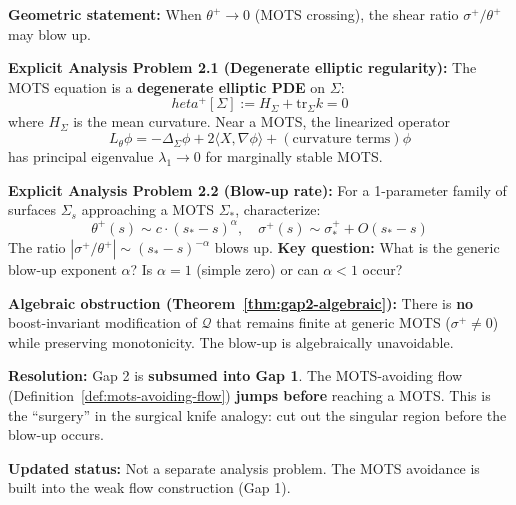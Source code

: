 \begin{remark}
\textbf{Geometric statement:} When $\theta^+ \to 0$ (MOTS crossing), the shear ratio $\sigma^+/\theta^+$ may blow up.

\textbf{Explicit Analysis Problem 2.1 (Degenerate elliptic regularity):}
The MOTS equation is a \textbf{degenerate elliptic PDE} on $\Sigma$:
\begin{equation}
\label{eq:mots-equation}
	heta^+[\Sigma] := H_\Sigma + \mathrm{tr}_\Sigma k = 0
\end{equation}
where $H_\Sigma$ is the mean curvature. Near a MOTS, the linearized operator
$$L_\theta \phi = -\Delta_\Sigma \phi + 2\langle X, \nabla \phi \rangle + (\text{curvature terms})\phi$$
has principal eigenvalue $\lambda_1 \to 0$ for marginally stable MOTS.

\textbf{Explicit Analysis Problem 2.2 (Blow-up rate):}
For a 1-parameter family of surfaces $\Sigma_s$ approaching a MOTS $\Sigma_*$, characterize:
\begin{equation}
\theta^+(s) \sim c \cdot (s_* - s)^\alpha, \quad \sigma^+(s) \sim \sigma_*^+ + O(s_* - s)
\end{equation}
The ratio $|\sigma^+/\theta^+| \sim (s_* - s)^{-\alpha}$ blows up. \textbf{Key question:} What is the generic blow-up exponent $\alpha$? Is $\alpha = 1$ (simple zero) or can $\alpha < 1$ occur?

\textbf{Algebraic obstruction (Theorem~\ref{thm:gap2-algebraic}):} There is \textbf{no} boost-invariant modification of $\mathcal{Q}$ that remains finite at generic MOTS ($\sigma^+ \neq 0$) while preserving monotonicity. The blow-up is algebraically unavoidable.

\textbf{Resolution:} Gap 2 is \textbf{subsumed into Gap 1}. The MOTS-avoiding flow (Definition~\ref{def:mots-avoiding-flow}) \textbf{jumps before} reaching a MOTS. This is the ``surgery'' in the surgical knife analogy: cut out the singular region before the blow-up occurs.

\textbf{Updated status:} Not a separate analysis problem. The MOTS avoidance is built into the weak flow construction (Gap 1).
\end{remark}

